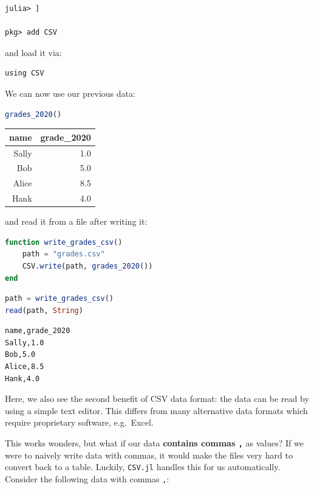 \documentclass[
  notoc %
]{tufte-book}
\newcommand{\passthrough}[1]{#1}
\begin{document}
\begin{lstlisting}
julia> ]

pkg> add CSV
\end{lstlisting}

and load it via:

\begin{lstlisting}
using CSV
\end{lstlisting}

We can now use our previous data:

\begin{lstlisting}[language=Julia]
grades_2020()
\end{lstlisting}

\begin{longtable}[]{@{}rr@{}}
\toprule
name & grade\_2020 \\
\midrule
\endhead
Sally & 1.0 \\
Bob & 5.0 \\
Alice & 8.5 \\
Hank & 4.0 \\
\bottomrule
\end{longtable}

and read it from a file after writing it:

\begin{lstlisting}[language=Julia]
function write_grades_csv()
    path = "grades.csv"
    CSV.write(path, grades_2020())
end
\end{lstlisting}

\begin{lstlisting}[language=Julia]
path = write_grades_csv()
read(path, String)
\end{lstlisting}

\begin{lstlisting}[language=Output]
name,grade_2020
Sally,1.0
Bob,5.0
Alice,8.5
Hank,4.0

\end{lstlisting}

Here, we also see the second benefit of CSV data format: the data can be
read by using a simple text editor. This differs from many alternative
data formats which require proprietary software, e.g.~Excel.

This works wonders, but what if our data \textbf{contains commas
\passthrough{\lstinline!,!}} as values? If we were to naively write data
with commas, it would make the files very hard to convert back to a
table. Luckily, \passthrough{\lstinline!CSV.jl!} handles this for us
automatically. Consider the following data with commas
\passthrough{\lstinline!,!}:
\end{document}

